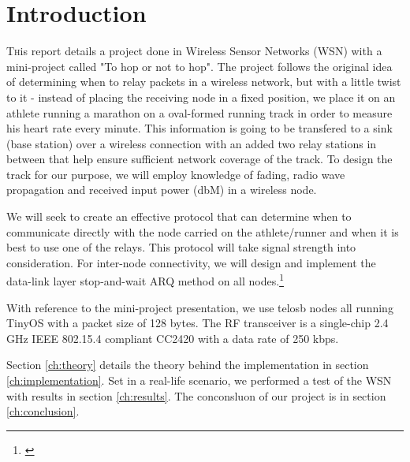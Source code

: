 \section{Introduction}\label{ch:introduction}

\lettrine[nindent=0em,lines=3]{T} his report details a project done in Wireless Sensor Networks (WSN) with a mini-project called "To hop or not to hop". The project follows the original idea of determining when to relay packets in a wireless network, but with a little twist to it - instead of placing the receiving node in a fixed position, we place it on an athlete running a marathon on a oval-formed running track in order to measure his heart rate every minute. This information is going to be transfered to a sink (base station) over a wireless connection with an added two relay stations in between that help ensure sufficient network coverage of the track. To design the track for our purpose, we will employ knowledge of fading, radio wave propagation and received input power (dbM) in a wireless node.

\noindent We will seek to create an effective protocol that can determine when to communicate directly with the node carried on the athlete/runner and when it is best to use one of the relays. This protocol will take signal strength into consideration. For inter-node connectivity, we will design and implement the data-link layer stop-and-wait ARQ method on all nodes.\footnote{\cite{Ieee}}

\noindent With reference to the mini-project presentation, we use telosb nodes all running TinyOS with a packet size of 128 bytes. The RF transceiver is a single-chip 2.4 GHz IEEE 802.15.4 compliant CC2420 with a data rate of 250 kbps.

\noindent Section \ref{ch:theory} details the theory behind the implementation in section \ref{ch:implementation}. Set in a real-life scenario, we performed a test of the WSN with results in section \ref{ch:results}. The conconsluon of our project is in section \ref{ch:conclusion}.

